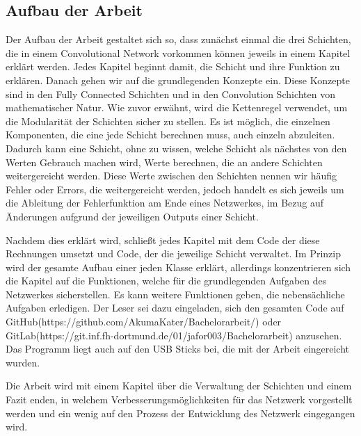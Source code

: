 \documentclass[12pt]{article}
\begin{document}
\subsection{Aufbau der Arbeit}
Der Aufbau der Arbeit gestaltet sich so, dass zunächst einmal die drei Schichten, die in einem Convolutional Network vorkommen können jeweils in einem Kapitel erklärt werden. Jedes Kapitel beginnt damit, die Schicht und ihre Funktion zu erklären. Danach gehen wir auf die grundlegenden Konzepte ein. Diese Konzepte sind in den Fully Connected Schichten und in den Convolution Schichten von mathematischer Natur. Wie zuvor erwähnt, wird die Kettenregel verwendet, um die Modularität der Schichten sicher zu stellen. Es ist möglich, die einzelnen Komponenten, die eine jede Schicht berechnen muss, auch einzeln abzuleiten. Dadurch kann eine Schicht, ohne zu wissen, welche Schicht als nächstes von den Werten Gebrauch machen wird, Werte berechnen, die an andere Schichten weitergereicht werden. Diese Werte zwischen den Schichten nennen wir häufig Fehler oder Errors, die weitergereicht werden, jedoch handelt es sich jeweils um die Ableitung der Fehlerfunktion am Ende eines Netzwerkes, im Bezug auf Änderungen aufgrund der jeweiligen Outputs einer Schicht.

Nachdem dies erklärt wird, schließt jedes Kapitel mit dem Code der diese Rechnungen umsetzt und Code, der die jeweilige Schicht verwaltet. Im Prinzip wird der gesamte Aufbau einer jeden Klasse erklärt, allerdings konzentrieren sich die Kapitel auf die Funktionen, welche für die grundlegenden Aufgaben des Netzwerkes sicherstellen. Es kann weitere Funktionen geben, die nebensächliche Aufgaben erledigen. Der Leser sei dazu eingeladen, sich den gesamten Code auf GitHub(https://github.com/AkumaKater/Bachelorarbeit/) oder GitLab(https://git.inf.fh-dortmund.de/01/jafor003/Bachelorarbeit) anzusehen. Das Programm liegt auch auf den USB Sticks bei, die mit der Arbeit eingereicht wurden.

Die Arbeit wird mit einem Kapitel über die Verwaltung der Schichten und einem Fazit enden, in welchem Verbesserungsmöglichkeiten für das Netzwerk vorgestellt werden und ein wenig auf den Prozess der Entwicklung des Netzwerk eingegangen wird.
\end{document}
